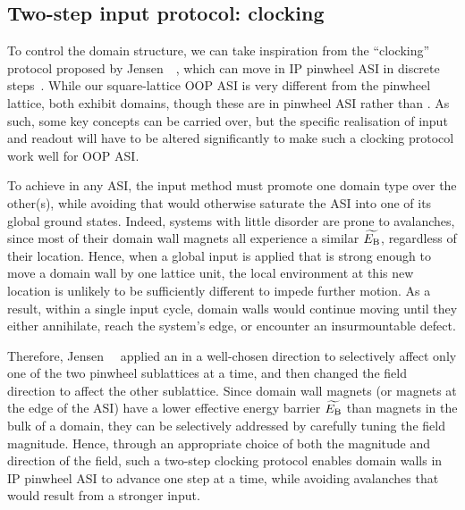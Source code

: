\subsection{Two-step input protocol: clocking}
To control the domain structure, we can take inspiration from the ``clocking'' protocol proposed by Jensen~\etal~\cite{clocking-protocol}, which can move  in IP pinwheel ASI in discrete steps~\cite{SnakesInThePlane}.
While our square-lattice OOP ASI is very different from the pinwheel lattice, both exhibit domains, though these are  in pinwheel ASI rather than .
As such, some key concepts can be carried over, but the specific realisation of input and readout will have to be altered significantly to make such a clocking protocol work well for OOP ASI. \par
To achieve  in any ASI, the input method must promote one domain type over the other(s), while avoiding  that would otherwise saturate the ASI into one of its global ground states. %
Indeed, systems with little disorder are prone to avalanches, since most of their domain wall magnets all experience a similar  $\widetilde{E_\mathrm{B}}$, regardless of their location.
Hence, when a global input is applied that is strong enough to move a domain wall by one lattice unit, the local environment at this new location is unlikely to be sufficiently different to impede further motion.
As a result, within a single input cycle, domain walls would continue moving until they either annihilate, reach the system's edge, or encounter an insurmountable defect. \par
Therefore, Jensen~\etal~\cite{clocking-protocol} applied an  in a well-chosen direction to selectively affect only one of the two pinwheel sublattices at a time, and then changed the field direction to affect the other sublattice.
Since domain wall magnets (or magnets at the edge of the ASI) have a lower effective energy barrier $\widetilde{E_\mathrm{B}}$ than magnets in the bulk of a domain, they can be selectively addressed by carefully tuning the field magnitude.
Hence, through an appropriate choice of both the magnitude and direction of the field, such a two-step clocking protocol enables domain walls in IP pinwheel ASI to advance one step at a time, while avoiding avalanches that would result from a stronger input. \par
